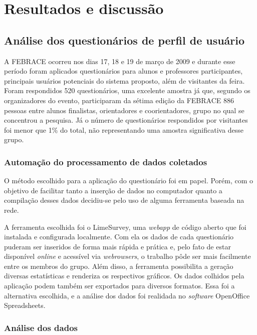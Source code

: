 
\chapter{Resultados e discussão}

\section{Análise dos questionários de perfil de usuário}

    A FEBRACE ocorreu nos dias 17, 18 e 19 de março de 2009 e durante esse período foram aplicados questionários para alunos e professores participantes, principais usuários potenciais do sistema proposto, além de visitantes da feira. Foram respondidos 520 questionários, uma excelente amostra já que, segundo os organizadores do evento, participaram da sétima edição da FEBRACE 886 pessoas entre alunos finalistas, orientadores e coorientadores, grupo no qual se concentrou a pesquisa. Já o número de questionários respondidos por visitantes foi menor que 1\% do total, não representando uma amostra significativa desse grupo.

  \subsection{Automação do processamento de dados coletados}
    O método escolhido para a aplicação do questionário foi em papel. Porém, com o objetivo de facilitar tanto a inserção de dados no computador quanto a compilação desses dados decidiu-se pelo uso de alguma ferramenta baseada na rede.

    A ferramenta escolhida foi o LimeSurvey, uma \textit{webapp} de código aberto que foi instalada e configurada localmente. Com ela os dados de cada questionário puderam ser inseridos de forma mais rápida e prática e, pelo fato de estar disponível \textit{online} e acessível via \textit{webrowsers}, o trabalho pôde ser mais facilmente entre os membros do grupo. Além disso, a ferramenta possibilita a geração diversas estatísticas e renderiza os respectivos gráficos. Os dados colhidos pela aplicação podem também ser exportados para diversos formatos. Essa foi a alternativa escolhida, e a análise dos dados foi realidada no \textit{software} OpenOffice Spreadsheets.

  \subsection{Análise dos dados}

